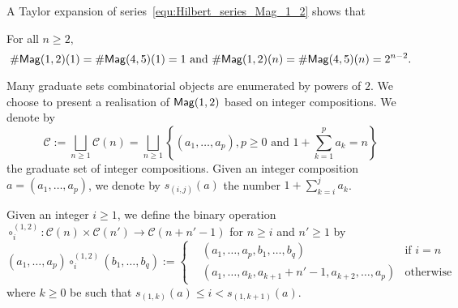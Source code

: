A Taylor expansion of series~\eqref{equ:Hilbert_series_Mag_1_2} shows
that
\begin{Proposition} \label{prop:Close_formula_Mag_1_2}
For all $n \geq 2,$
\begin{equation} \label{equ:Close_formula_Mag_1_2}
\# \mathsf{Mag}(1,2)(1) = \# \mathsf{Mag}(4,5)(1) = 1 \text{ and } \# \mathsf{Mag}(1,2)(n) =
\# \mathsf{Mag}(4,5)(n) = 2^{n-2}.
\end{equation}
\end{Proposition}

Many graduate sets combinatorial objects are enumerated by
powers of $2$. We choose to present a realisation of $\mathsf{Mag}(1,2)$ based on
integer compositions. We denote by
\begin{equation}
\mathcal{C} := \bigsqcup\limits_{n \geq 1} \mathcal{C}(n) =
\bigsqcup\limits_{n \geq 1}\left\{ (a_1 , \dots, a_p), p \geq 0
\text{ and } 1+\sum\limits_{k = 1}^{p} a_k = n \right\}
\end{equation}
the graduate set of integer compositions. Given an integer composition
$a = (a_1 , \dots, a_p)$, we denote by $s_{(i,j)}(a)$ the number
$1 + \sum\limits_{k = i}^{j} a_k$.

Given an integer $i \geq 1$, we define the binary operation
$\circ_i^{(1,2)} : \mathcal{C}(n) \times \mathcal{C}(n') \rightarrow \mathcal{C}(n + n' -1)$ for
$n \geq i$ and $n' \geq 1$ by
\begin{equation}
\left(a_1 , \dots, a_p \right) \circ_i^{(1,2)}
\left(b_1, \dots ,b_{q}\right) := \left\{
 \begin{split}
 & \left(a_1, \dots ,a_{p}, b_1, \dots ,b_{q}\right) &
    \text{if } i = n\\
 & \left(a_1, \dots, a_{k}, a_{k+1} + n'-1, a_{k+2}, \dots ,a_{p}\right)
  & \text{otherwise}
 \end{split}
\right.
\end{equation}
where $k \geq 0$ be such that $s_{(1,k)}(a) \leq i < s_{(1,k+1)}(a)$.


